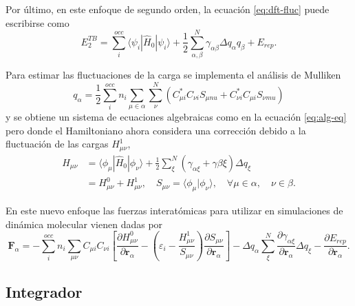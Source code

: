 \begin{enumerate}
        Por último, en este enfoque de segundo orden, la ecuación 
        \ref{eq:dft-fluc} puede escribirse como
        $$
        E_2^{TB} = \sum_i^{occ} \langle \psi_i | \hat{H}_0 | \psi_i \rangle + \frac{1}{2} \sum_{\alpha, \beta}^N \gamma_{\alpha\beta} \Delta q_{\alpha} q_{\beta} + E_{rep}.
        $$

        Para estimar las fluctuaciones de la carga se implementa el análisis de
        Mulliken
        $$
        q_{\alpha} = \frac{1}{2} \sum_i^{occ} n_i \sum_{\mu \in \alpha} \sum_{\nu}^N (C_{\mu i}^{*} C_{\nu i} S_{\mu nu} + C_{\nu i}^{*} C_{\mu i} S_{\nu mu})
        $$
        y se obtiene un sistema de ecuaciones algebraicas como en la ecuación
        \ref{eq:alg-eq} pero donde el Hamiltoniano ahora considera una 
        corrección debido a la fluctuación de las cargas $H_{\mu \nu}^1$,
        \begin{equation*}
            \begin{aligned}
                H_{\mu \nu} &= \langle \phi_{\mu} | \hat{H}_0 | \phi_{\nu} \rangle + \frac{1}{2}\sum_{\xi}^N (\gamma_{\alpha\xi} + \gamma{\beta\xi}) \Delta q_{\xi} \\
                &= H_{\mu\nu}^0 + H_{\mu\nu}^1, \quad S_{\mu\nu} = \langle \phi_{\mu} | \phi_{\nu} \rangle, \quad \forall \mu \in \alpha, \quad \nu \in \beta.
            \end{aligned}
        \end{equation*}

        En este nuevo enfoque las fuerzas interatómicas para utilizar en 
        simulaciones de dinámica molecular vienen dadas por
        $$
        \mathbf{F}_{\alpha} = - \sum_i^{occ} n_i \sum_{\mu\nu} C_{\mu i} C_{\nu i} \left[\frac{\partial H_{\mu\nu}^0}{\partial \mathbf{r}_{\alpha}} - \left(\varepsilon_i - \frac{H_{\mu\nu}^1}{S_{\mu\nu}}\right) \frac{\partial S_{\mu\nu}}{\partial \mathbf{r}_{\alpha}} \right] - \Delta q_{\alpha} \sum_{\xi}^N \frac{\partial \gamma_{\alpha\xi}}{\partial \mathbf{r}_{\alpha}} \Delta q_{\xi} - \frac{\partial E_{rep}}{\partial \mathbf{r}_{\alpha}}.
        $$
 
\end{enumerate}

\subsection{Integrador}

